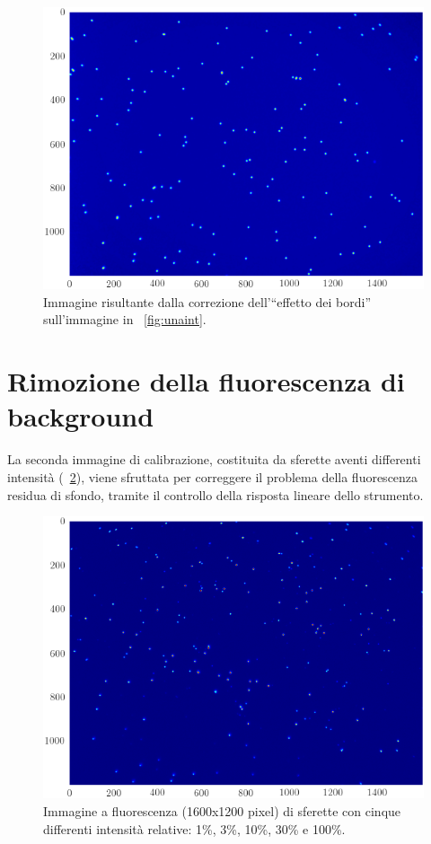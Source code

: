 \begin{figure}
 \centering
 \includegraphics[scale=.64]{img/CAP3unaintcorr.png}
 \caption{\small{Immagine risultante dalla correzione dell'``effetto dei bordi'' sull'immagine in \figurename~\ref{fig:unaint}.}}
 \label{fig:unaintcorr}
\end{figure}



\section{Rimozione della fluorescenza di background}

La seconda immagine di calibrazione, costituita da sferette aventi differenti intensità (\figurename~\ref{fig:piuint}), viene sfruttata per correggere il problema della fluorescenza residua di sfondo, tramite il controllo della risposta lineare dello strumento. 

\begin{figure}
 \centering
 \includegraphics[scale=.64]{img/CAP3piuint.png}
 \caption{\small{Immagine a fluorescenza (1600x1200 pixel) di sferette con cinque differenti intensità relative: 1\%, 3\%, 10\%, 30\% e 100\%.}}
 \label{fig:piuint}
\end{figure}

